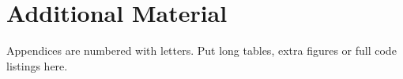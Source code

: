 \chapter{Additional Material}
\label{app:extra}

Appendices are numbered with letters. Put long tables, extra figures or
full code listings here.
